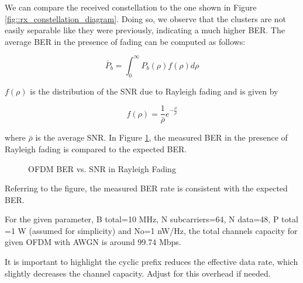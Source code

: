 \documentclass[conference]{IEEEtran}
\begin{document}
    		We can compare the received constellation to the one shown in Figure \ref{fig::rx_constellation_diagram}. Doing so, we observe that the clusters are not easily separable like they were previously, indicating a much higher BER. The average BER in the presence of fading can be computed as follows:
    		
    		\begin{equation}
    			\bar{P}_b = \int_{0}^{\infty}{P_b(\rho)f(\rho)d\rho}
    		\end{equation}
    		
    		$f(\rho)$ is the distribution of the SNR due to Rayleigh fading and is given by
    		
    		\begin{equation}
    			f(\rho) = \frac{1}{\bar{\rho}}e^{-\frac{\rho}{\bar{\rho}}}
    		\end{equation}
    			
    		where $\bar{\rho}$ is the average SNR. In Figure \ref{fig::ofdm_fading_ber}, the measured BER in the presence of Rayleigh fading is compared to the expected BER.
    		
    		\begin{figure}[H]
			\centering
    			\caption{OFDM BER vs. SNR in Rayleigh Fading}
    			\label{fig::ofdm_fading_ber}
  	  	\end{figure}
  	  
  	  	Referring to the figure, the measured BER rate is consistent with the expected BER.
    		
    	    	  
  	  For the given parameter, B total=10 MHz, N subcarriers=64, N data=48, P total =1 W (assumed for simplicity) and No=1 nW/Hz, the total channels capacity for given OFDM  with AWGN is around 99.74 Mbps. \par
  	 It is important to highlight the cyclic prefix reduces the effective data rate, which slightly decreases the channel capacity. Adjust for this overhead if needed.
    
\end{document}
